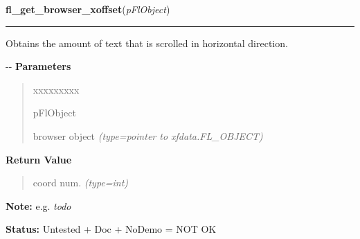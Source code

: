     \label{xformslib:flbrowser:fl_get_browser_xoffset}

    \vspace{0.5ex}

\hspace{.8\funcindent}\begin{boxedminipage}{\funcwidth}

    \raggedright \textbf{fl\_get\_browser\_xoffset}(\textit{pFlObject})

    \vspace{-1.5ex}

    \rule{\textwidth}{0.5\fboxrule}
\setlength{\parskip}{2ex}

Obtains the amount of text that is scrolled in horizontal direction.

-{}-
\setlength{\parskip}{1ex}
      \textbf{Parameters}
      \vspace{-1ex}

      \begin{quote}
        \begin{Ventry}{xxxxxxxxx}

          \item[pFlObject]


browser object
            {\it (type=pointer to xfdata.FL\_OBJECT)}

        \end{Ventry}

      \end{quote}

      \textbf{Return Value}
    \vspace{-1ex}

      \begin{quote}

coord num.
      {\it (type=int)}

      \end{quote}

\textbf{Note:} 
e.g. \emph{todo}


\textbf{Status:} 
Untested + Doc + NoDemo = NOT OK


    \end{boxedminipage}

    \label{xformslib:flbrowser:fl_get_browser_rel_xoffset}

